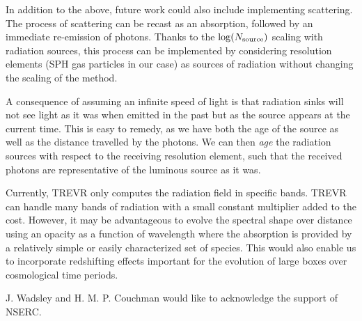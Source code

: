 \documentclass[fleq,usenatbib]{mnras}
\newcommand{\acro}{TREVR}
\newcommand{\NS}{N_{\rm source}}
\begin{document}
{In addition to the above, future work could also include
implementing scattering.  The process of 
scattering can be recast as an absorption, followed by an immediate re-emission 
of photons.  Thanks to the $\log(\NS)$ scaling with radiation sources, this 
process can be implemented by considering resolution elements (SPH gas 
particles in our case) as sources of radiation without changing the scaling of 
the method.

A consequence of assuming an infinite speed of light is that 
radiation sinks will not see light as it was when emitted in the past but as the source appears
at the current time.  This is easy to 
remedy, as we have both the age of the source as well as the distance 
travelled by the photons. We can then \textit{age} the radiation sources with 
respect to the receiving resolution element, such that the received photons 
are representative of the luminous source as it was.

Currently, \acro{} only 
computes the radiation field in specific bands.  \acro{} can handle many bands 
of radiation with a small constant multiplier added to the cost.  However, it 
may be advantageous to evolve the spectral shape over distance using an opacity as
a function of wavelength where the absorption is provided by a relatively simple
or easily characterized set of species.
This would also enable us to incorporate redshifting effects important 
for the evolution of large boxes over cosmological time periods.

J. Wadsley and H. M. P. Couchman would like to acknowledge the support of 
NSERC.







\appendix
}
\end{document}
